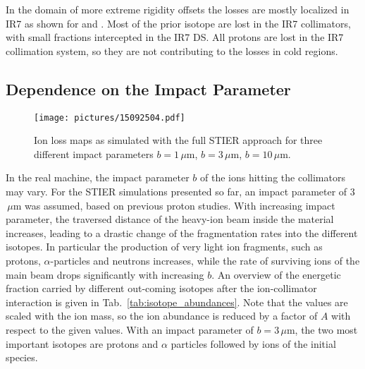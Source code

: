 In the domain of more extreme rigidity offsets the losses are mostly localized in IR7 as shown for  and . Most of the prior isotope are lost in the IR7 collimators, with small fractions intercepted in the IR7 DS. All protons are lost in the IR7 collimation system, so they are not contributing to the losses in cold regions.



\subsection{Dependence on the Impact Parameter} \label{subsec:impactparam}

\begin{figure}[t]
  \begin{center}
\texttt{[image: pictures/15092504.pdf]}
\caption{Ion loss maps as simulated with the full STIER approach for three different impact parameters \mbox{$b=1\,\mu$m}, \mbox{$b=3\,\mu$m}, \mbox{$b=10\,\mu$m}.}
\label{fig:15062502.pdf}
  \end{center}
\end{figure}
In the real machine, the impact parameter $b$ of the ions hitting the collimators may vary. For the STIER simulations presented so far, an impact parameter of 3$\,\mu$m was assumed, based on previous proton studies.  With increasing impact parameter, the traversed distance of the heavy-ion beam inside the material increases, leading to a drastic change of the fragmentation rates into the different isotopes. In particular the production of very light ion fragments, such as protons, $\alpha$-particles and neutrons increases, while the rate of surviving ions of the main beam drops significantly with increasing $b$. An overview of the energetic fraction carried by different out-coming isotopes after the ion-collimator interaction is given in Tab.~\ref{tab:isotope_abundances}. Note that the values are scaled with the ion mass, so the ion abundance is reduced by a factor of $A$ with respect to the given values. With an impact parameter of $b=3\,\mu$m, the two most important isotopes are protons and $\alpha$ particles followed by \lead ions of the initial species. 
\\
